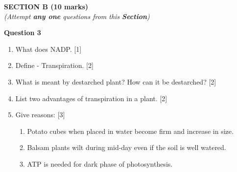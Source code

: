 \newpage
\begin{center}
   \large
   \textbf{SECTION B (10 marks)}\\
   \vspace{5mm}
   \normalsize
   \textit{(Attempt \textbf{any one} questions from this \textbf{Section})}
\end{center}
\par

\noindent
\textbf{Question 3}
\begin{enumerate}[label=(\alph*)]
    \item What does NADP. \hfill[1]
    \item Define - Transpiration. \hfill[2]
    \item What is meant by destarched plant? How can it be destarched? \hfill[2]
    \item List two advantages of transpiration in a plant. \hfill[2]
    \item Give reasons: \hfill[3]
        \begin{enumerate}[label=(\roman*)]
        \item Potato cubes when placed in water become firm and increase in size.
        \item Balsam plants wilt during mid-day even if the soil is well watered.
        \item ATP is needed for dark phase of photosynthesis.
        \end{enumerate}
\end{enumerate}

